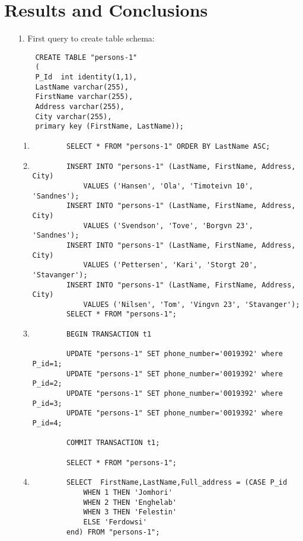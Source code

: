 \documentclass{article}
\begin{document}
\section{Results and Conclusions}
\begin{enumerate}
	\item[1.]
		First query to create table schema:
	\begin{verbatim}
	CREATE TABLE "persons-1"
	(
	P_Id  int identity(1,1),
	LastName varchar(255),
	FirstName varchar(255),
	Address varchar(255),
	City varchar(255),
	primary key (FirstName, LastName));
	\end{verbatim}

	\begin{enumerate}
		\item
	    \begin{verbatim}
	    SELECT * FROM "persons-1" ORDER BY LastName ASC;
	    \end{verbatim}
		\item
	    \begin{verbatim}
	    INSERT INTO "persons-1" (LastName, FirstName, Address, City)
	    	VALUES ('Hansen', 'Ola', 'Timoteivn 10', 'Sandnes');
	    INSERT INTO "persons-1" (LastName, FirstName, Address, City)
	    	VALUES ('Svendson', 'Tove', 'Borgvn 23', 'Sandnes');
	    INSERT INTO "persons-1" (LastName, FirstName, Address, City)
	    	VALUES ('Pettersen', 'Kari', 'Storgt 20', 'Stavanger');
	    INSERT INTO "persons-1" (LastName, FirstName, Address, City)
	    	VALUES ('Nilsen', 'Tom', 'Vingvn 23', 'Stavanger');
	    SELECT * FROM "persons-1";
	    \end{verbatim}
    \item

	    \begin{verbatim}
	    BEGIN TRANSACTION t1

	    UPDATE "persons-1" SET phone_number='0019392' where P_id=1;
	    UPDATE "persons-1" SET phone_number='0019392' where P_id=2;
	    UPDATE "persons-1" SET phone_number='0019392' where P_id=3;
	    UPDATE "persons-1" SET phone_number='0019392' where P_id=4;

	    COMMIT TRANSACTION t1;

	    SELECT * FROM "persons-1";
	    \end{verbatim}

    \item

	    \begin{verbatim}
	    SELECT  FirstName,LastName,Full_address = (CASE P_id
		    WHEN 1 THEN 'Jomhori'
		    WHEN 2 THEN 'Enghelab'
		    WHEN 3 THEN 'Felestin'
		    ELSE 'Ferdowsi'
	    end) FROM "persons-1";
	    \end{verbatim}


\end{enumerate}
\end{enumerate}
\end{document}
